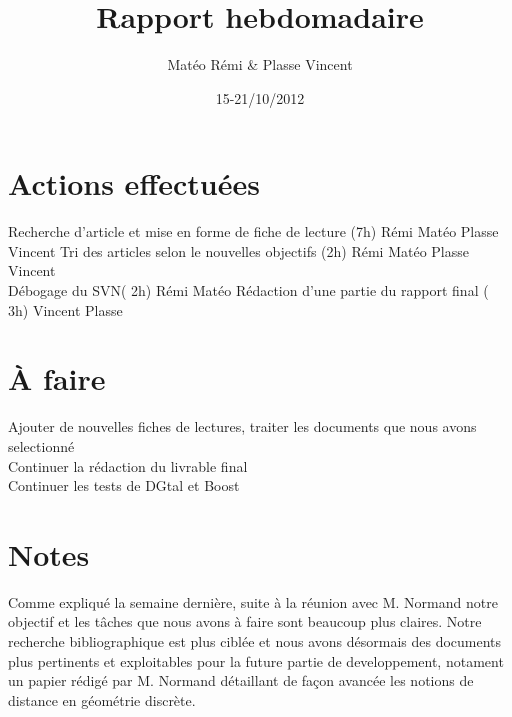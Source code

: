 \documentclass{article}
\title{Rapport hebdomadaire}
\author{Matéo Rémi \& Plasse Vincent}
\date{15-21/10/2012}
\begin{document}
\maketitle

\section{Actions effectuées}
Recherche d'article et mise en forme de fiche de lecture (7h) Rémi Matéo Plasse Vincent
Tri des articles selon le nouvelles objectifs (2h) Rémi Matéo Plasse Vincent \\
Débogage du SVN( 2h) Rémi Matéo
Rédaction d'une partie du rapport final ( 3h) Vincent Plasse\\

\section{À faire} 
Ajouter de nouvelles fiches de lectures, traiter les documents que nous avons selectionné \\
Continuer la rédaction du livrable final \\
Continuer les tests de DGtal et Boost\\

\section{Notes}

Comme expliqué la semaine dernière, suite à la réunion avec M. Normand notre objectif et les tâches que nous avons à faire sont beaucoup plus claires. Notre recherche bibliographique est plus ciblée et nous avons désormais des documents plus pertinents et exploitables pour la future partie de developpement, notament un papier rédigé par M. Normand détaillant de façon avancée les notions de distance en géométrie discrète.\\
\end{document}
